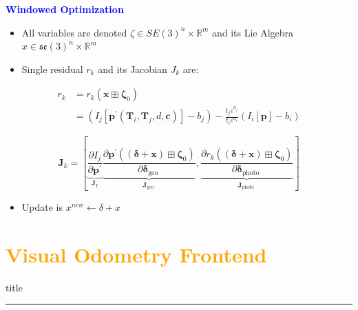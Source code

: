 \documentclass[aspectratio=169]{beamer}
\begin{document}
\begin{frame}{\textcolor{blue}{\textbf{Windowed Optimization}}}
	\vspace{-0.5cm}
	\begin{itemize}
			\item All variables are denoted $\zeta \in SE(3)^n \times \mathbb{R}^m$ and its Lie Algebra $x \in \mathfrak{se}(3)^n \times \mathbb{R}^m$
			\item Single residual $r_k$ and its Jacobian $J_k$ are:
	\end{itemize}

	\begin{equation}
		\begin{aligned}
		r_k & =r_k\left(\boldsymbol{x} \boxplus \boldsymbol{\zeta}_0\right) \\
		& =\left(I_j\left[\mathbf{p}^{\prime}\left(\mathbf{T}_i, \mathbf{T}_j, d, \mathbf{c}\right)\right]-b_j\right)-\frac{t_j e^{a_j}}{t_i e^{a_i}}\left(I_i[\mathbf{p}]-b_i\right)
		\end{aligned}
	\end{equation}

	\begin{equation}
			\mathbf{J}_k=[\underbrace{\frac{\partial I_j}{\partial \mathbf{p}^{\prime}}}_{\mathbf{J}_I} \underbrace{\frac{\partial \mathbf{p}^{\prime}\left((\boldsymbol{\delta}+\boldsymbol{x}) \boxplus \boldsymbol{\zeta}_0\right)}{\partial \boldsymbol{\delta}_{\text {geo }}}}_{\mathbf{J}_{\text {geo }}}, \underbrace{\frac{\partial r_k\left((\boldsymbol{\delta}+\boldsymbol{x}) \boxplus \boldsymbol{\zeta}_0\right)}{\partial \boldsymbol{\delta}_{\text {photo }}}}_{\mathbf{J}_{\text {photo }}}]
	\end{equation}

	\begin{itemize}
			\item Update is $x^{new} \leftarrow \delta + x$
	\end{itemize}

\end{frame}


\section*{\textbf{\textcolor{orange}{Visual Odometry Frontend}}}
		\begin{frame}[plain]
				\vfill
			\centering
			\begin{beamercolorbox}[sep=8pt,center,shadow=true,rounded=true]{title}
				\insertsectionhead\par%
				\color{oxfordblue}\noindent\rule{10cm}{1pt}
			\end{beamercolorbox}
			\vfill
	\end{frame}
\end{document}
